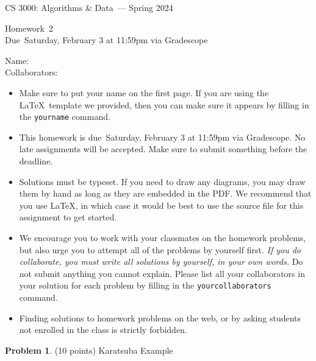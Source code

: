 \documentclass[11pt]{article}
\newcommand{\yourname}{}
\newcommand{\yourcollaborators}{}
\theoremstyle{definition}
\theoremstyle{theorem}
\newtheorem{prob}{Problem}
\newcommand{\course}{CS 3000: Algorithms \& Data}
\newcommand{\semester}{Spring 2024}
\newcommand{\hwnum}{2}
\newcommand{\hwdue}{Saturday, February 3 at 11:59pm via Gradescope}
\begin{document}
{\Large 
\begin{center} \course\ --- \semester\ \end{center}}
{\large
\vspace{10pt}
\noindent Homework~\hwnum \vspace{2pt}\\
Due~\hwdue}

\vspace{15pt}
\bigskip
{\large
\noindent Name: \yourname \vspace{2pt}\\ Collaborators: \yourcollaborators}

\vspace{15pt}
\begin{itemize}

\item
  Make sure to put your name on the first page.  If you are using the
  \LaTeX~template we provided, then you can make sure it appears by
  filling in the \texttt{yourname} command.

\item This homework is due~\hwdue.  No late assignments will be accepted.  Make sure to submit something before the deadline.

\item Solutions must be typeset.  If you need to draw any diagrams,
  you may draw them by hand as long as they are embedded in the PDF.
  We recommend that you use \LaTeX, in which case it would be best to
  use the source file for this assignment to get started.

\item We encourage you to work with your classmates on the homework
  problems, but also urge you to attempt all of the problems by
  yourself first. \emph{If you do collaborate, you must write all
    solutions by yourself, in your own words.}  Do not submit anything
  you cannot explain.  Please list all your collaborators in your
  solution for each problem by filling in the
  \texttt{yourcollaborators} command.

\item Finding solutions to homework problems on the web, or by asking
  students not enrolled in the class is strictly forbidden.

\end{itemize}
\newpage



\newpage
\begin{prob} (10 points) Karatsuba Example \end{prob}
\end{document}
